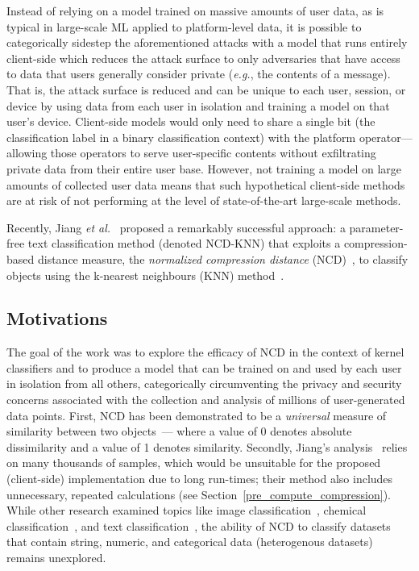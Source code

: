 \documentclass[preprint,12pt]{article}
\begin{document}
Instead of relying on a model trained on massive amounts of user data, as is typical in large-scale ML applied to platform-level data, it is possible to categorically sidestep the aforementioned attacks with a model that runs entirely client-side which  reduces the attack surface to only adversaries that have access to data that users generally consider private (\textit{e.g.}, the contents of a message). 
That is, the attack surface is reduced and can be unique to each user, session, or device by using data from each user in isolation and training a model on that user's device. Client-side models would only need to share a single bit (the classification label in a binary classification context) with the platform operator---allowing those operators to serve user-specific contents without exfiltrating private data from their entire user base. 
However, not training a model on large amounts of collected user data means that such hypothetical client-side methods are at risk of not performing at the level of state-of-the-art large-scale methods.

Recently, Jiang \textit{et al.}~\cite{jiang2022less} proposed a remarkably successful approach: a parameter-free text classification method (denoted NCD-KNN) that exploits a compression-based distance measure, the \textit{normalized compression distance} (NCD)~\cite{ncd}, to classify objects using the k-nearest neighbours (KNN) method~\cite{shalev2014understanding}.




\subsection{Motivations}
The goal of the work was to explore the efficacy of NCD in the context of kernel classifiers and to produce a model  that can be trained on and used by each user in isolation from all others, categorically circumventing the privacy and security concerns associated with the collection and analysis of millions of user-generated data points. 
First, NCD has been demonstrated to be a \textit{universal} measure of similarity between two objects~\cite{ncd}--- where a value of 0 denotes absolute dissimilarity and a value of 1 denotes similarity.
Secondly, Jiang's analysis~\cite{jiang2022less} relies on many thousands of samples, which would be unsuitable for the proposed (client-side) implementation due to long run-times; their method also includes unnecessary, repeated calculations (see Section~\ref{pre_compute_compression}).
While other research examined topics like image classification~\cite{opitz2023gzip}, chemical classification~\cite{weinreich2023parameter}, and text classification~\cite{nishida2011tweet}, the ability of NCD to classify datasets that contain string, numeric, and categorical data (heterogenous datasets) remains unexplored.
\end{document}

